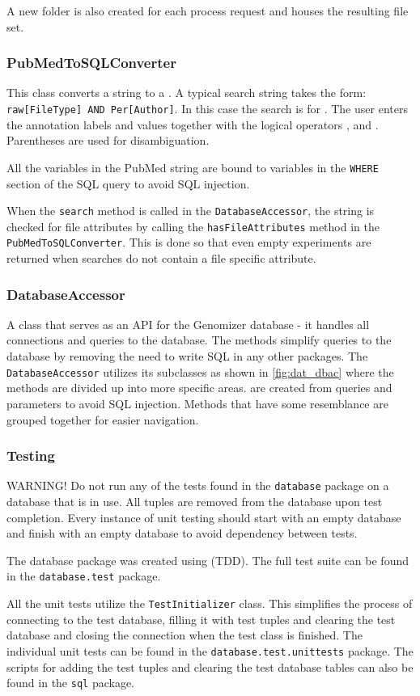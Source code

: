 A new folder is also created for each process request and houses the resulting file set.

\subsubsection{PubMedToSQLConverter}
This class converts a  string to a . A typical  search string takes the form: \texttt{raw[FileType] AND Per[Author]}. In this case the search is for . The user enters the annotation labels and values together with the logical operators ,  and . Parentheses are used for disambiguation. 

All the variables in the PubMed string are bound to variables in the \texttt{WHERE} section of the SQL query to avoid SQL injection. 

When the \texttt{search} method is called in the \texttt{DatabaseAccessor}, the  string is checked for file attributes by calling the \texttt{hasFileAttributes} method in the \texttt{PubMedToSQLConverter}. This is done so that even empty experiments are returned when searches do not contain a file specific attribute.

\subsubsection{DatabaseAccessor}
A class that serves as an API for the Genomizer database - it handles all connections and queries to the database. The methods simplify queries to the database by removing the need to write SQL in any other packages. The \texttt{DatabaseAccessor} utilizes its subclasses as shown in \ref{fig:dat_dbac} where the methods are divided up into more specific areas.  are created from queries and parameters to avoid SQL injection. Methods that have some resemblance are grouped together for easier navigation.

\subsubsection{Testing}
WARNING! Do not run any of the tests found in the \texttt{database} package on a database that is in use. All tuples are removed from the database upon test completion. Every instance of unit testing should start with an empty database and finish with an empty database to avoid dependency between tests.

The database package was created using  (TDD). The full test suite can be found in the \texttt{database.test} package.

All the unit tests utilize the \texttt{TestInitializer} class. This simplifies the process of connecting to the test database, filling it with test tuples and clearing the test database and closing the connection when the test class is finished. 
The individual unit tests can be found in the \texttt{database.test.unittests} package. The scripts for adding the test tuples and clearing the test database tables can also be found in the \texttt{sql} package.